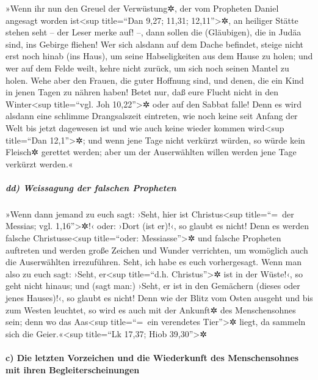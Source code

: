  »Wenn ihr nun den Greuel der Verwüstung✲, der vom
Propheten Daniel angesagt worden ist\textless sup title=``Dan 9,27;
11,31; 12,11''\textgreater✲, an heiliger Stätte stehen seht -- der Leser
merke auf! --,  dann sollen die (Gläubigen), die in Judäa
sind, ins Gebirge fliehen!  Wer sich alsdann auf dem
Dache befindet, steige nicht erst noch hinab (ins Haus), um seine
Habseligkeiten aus dem Hause zu holen;  und wer auf dem
Felde weilt, kehre nicht zurück, um sich noch seinen Mantel zu holen.
 Wehe aber den Frauen, die guter Hoffnung sind, und
denen, die ein Kind in jenen Tagen zu nähren haben! 
Betet nur, daß eure Flucht nicht in den Winter\textless sup title=``vgl.
Joh 10,22''\textgreater✲ oder auf den Sabbat falle!  Denn
es wird alsdann eine schlimme Drangsalszeit eintreten, wie noch keine
seit Anfang der Welt bis jetzt dagewesen ist und wie auch keine wieder
kommen wird\textless sup title=``Dan 12,1''\textgreater✲;
 und wenn jene Tage nicht verkürzt würden, so würde kein
Fleisch✲ gerettet werden; aber um der Auserwählten willen werden jene
Tage verkürzt werden.«

\hypertarget{dd-weissagung-der-falschen-propheten}{%
\subparagraph{dd) Weissagung der falschen
Propheten}\label{dd-weissagung-der-falschen-propheten}}

 »Wenn dann jemand zu euch sagt: ›Seht, hier ist
Christus\textless sup title=``=~der Messias; vgl. 1,16''\textgreater✲!‹
oder: ›Dort (ist er)!‹, so glaubt es nicht!  Denn es
werden falsche Christusse\textless sup title=``oder:
Messiasse''\textgreater✲ und falsche Propheten auftreten und werden
große Zeichen und Wunder verrichten, um womöglich auch die Auserwählten
irrezuführen.  Seht, ich habe es euch vorhergesagt. Wenn
man also zu euch sagt:  ›Seht, er\textless sup
title=``d.h. Christus''\textgreater✲ ist in der Wüste!‹, so geht nicht
hinaus; und (sagt man:) ›Seht, er ist in den Gemächern (dieses oder
jenes Hauses)!‹, so glaubt es nicht!  Denn wie der Blitz
vom Osten ausgeht und bis zum Westen leuchtet, so wird es auch mit der
Ankunft✲ des Menschensohnes sein;  denn wo das
Aas\textless sup title=``=~ein verendetes Tier''\textgreater✲ liegt, da
sammeln sich die Geier.«\textless sup title=``Lk 17,37; Hiob
39,30''\textgreater✲

\hypertarget{c-die-letzten-vorzeichen-und-die-wiederkunft-des-menschensohnes-mit-ihren-begleiterscheinungen}{%
\paragraph{c) Die letzten Vorzeichen und die Wiederkunft des
Menschensohnes mit ihren
Begleiterscheinungen}\label{c-die-letzten-vorzeichen-und-die-wiederkunft-des-menschensohnes-mit-ihren-begleiterscheinungen}}

